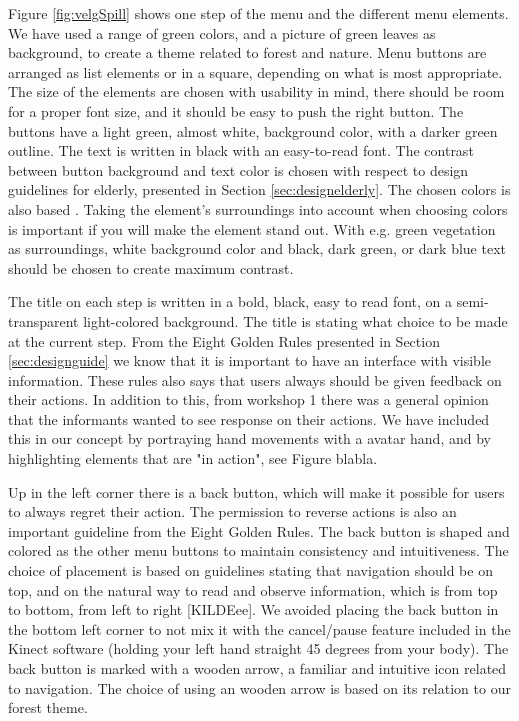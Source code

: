 Figure \ref{fig:velgSpill} shows one step of the menu and the different menu elements. We have used a range of green colors, and a picture of green leaves as background, to create a theme related to forest and nature. Menu buttons are arranged as list elements or in a square, depending on what is most appropriate. The size of the elements are chosen with usability in mind, there should be room for a proper font size, and it should be easy to push the right button. The buttons have a light green, almost white, background color, with a darker green outline. The text is written in black with an easy-to-read font. The contrast between button background and text color is chosen with respect to design guidelines for elderly, presented in Section \ref{sec:designelderly}. The chosen colors is also based \cite{blindeforbundetTekst}. Taking the element's surroundings into account when choosing colors is important if you will make the element stand out. With e.g. green vegetation as surroundings, white background color and black, dark green, or dark blue text should be chosen to create maximum contrast.   

The title on each step is written in a bold, black, easy to read font, on a semi-transparent light-colored background. The title is stating what choice to be made at the current step. From the Eight Golden Rules presented in Section \ref{sec:designguide} we know that it is important to have an interface with visible information. These rules also says that users always should be given feedback on their actions. In addition to this, from workshop 1 there was a general opinion that the informants wanted to see response on their actions. We have included this in our concept by portraying hand movements with a avatar hand, and by highlighting elements that are "in action", see Figure blabla.   

Up in the left corner there is a back button, which will make it possible for users to always regret their action. The permission to reverse actions is also an important guideline from the Eight Golden Rules. The back button is shaped and colored as the other menu buttons to maintain consistency and intuitiveness. The choice of placement is based on guidelines stating that navigation should be on top, and on the natural way to read and observe information, which is from top to bottom, from left to right [KILDEee]. We avoided placing the back button in the bottom left corner to not mix it with the cancel/pause feature included in the Kinect software (holding your left hand straight 45 degrees from your body). The back button is marked with a wooden arrow, a familiar and intuitive icon related to navigation. The choice of using an wooden arrow is based on its relation to our forest theme. 
       
